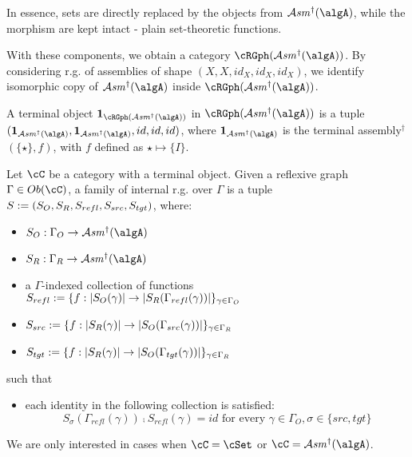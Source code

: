 \documentclass[12pt,a4paper]{article}
\def\cAsm{\mathcal{A}\mathit{sm}^\dagger}
\def\src{_{src}}\alwaysmath{src}
\def\rfl{_{refl}}\alwaysmath{rfl}
\def\tgt{_{tgt}}\alwaysmath{tgt}
\renewcommand{\O}{_{O}}\alwaysmath{O}
\def\R{_{R}}\alwaysmath{R}
\begin{document}
In essence, sets are directly replaced by the objects from $\cAsm(\algA)$, while the morphism are kept intact - plain set-theoretic functions.

With these components, we obtain a category $\cRGph(\cAsm(\algA))$. By considering r.g. of assemblies of shape $(X,X,id_X,id_X,id_X)$, we identify isomorphic copy of $\cAsm(\algA)$ inside $\cRGph(\cAsm(\algA))$.

A terminal object $\mathbf{1}_{\cRGph(\cAsm(\algA))}$ in $\cRGph(\cAsm(\algA))$ is a tuple $(\mathbf{1}_{\cAsm(\algA)}, \mathbf{1}_{\cAsm(\algA)}, id, id, id)$, where $\mathbf{1}_{\cAsm(\algA)}$ is the terminal assembly$^\dagger$ $(\{\star\},f)$, with $f$ defined as $\star \mapsto \{I\}$.

\begin{definition}
  \label{def:fam-refl-graphs}
  Let $\cC$ be a category with a terminal object. Given a reflexive graph $\Gamma \in \ob\cC$, a family of internal r.g. over $\Gamma$ is a tuple $S\define(S_O, S_R, S\rfl, S\src, S\tgt)$, where:
  \begin{itemize}[noitemsep]
    \item $S\O : \Gamma\O \to \cAsm(\algA)$
    \item $S\R : \Gamma\R \to \cAsm(\algA)$
    \item a $\Gamma$-indexed collection of functions $S\rfl \define \{f: \carr{S\O(\gamma)} \to \carr{S\R(\Gamma\rfl(\gamma))} \}_{\gamma \in \Gamma\O}$
    \item $S\src \define \{f: \carr{S\R(\gamma)} \to \carr{S\O(\Gamma\src(\gamma))} \}_{\gamma \in \Gamma\R}$
    \item $S\tgt \define \{f: \carr{S\R(\gamma)} \to \carr{S\O(\Gamma\tgt(\gamma))} \}_{\gamma \in \Gamma\R}$ 
  \end{itemize}
  such that 
  \begin{itemize}[noitemsep]
    \item each identity in the following collection is satisfied:
     $$S_\sigma(\Gamma\rfl(\gamma)) \comp S\rfl(\gamma) = id \text{ for every } \gamma \in \Gamma\O, \sigma \in \{src, tgt \}$$
  \end{itemize}

\end{definition}
We are only interested in cases when $\cC = \cSet$ or $\cC = \cAsm(\algA)$. 
\end{document}
